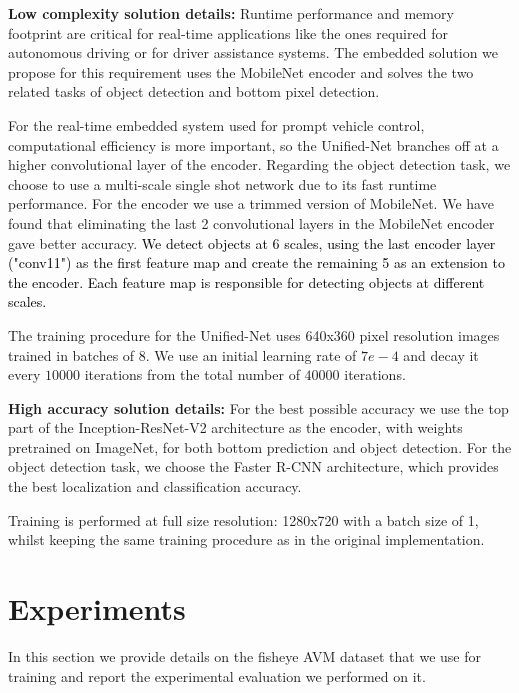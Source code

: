 \documentclass[10pt,twocolumn,letterpaper]{article}
\begin{document}
\textbf{Low complexity solution details: }
Runtime performance and memory footprint are critical for real-time applications like the ones required for autonomous driving or for driver assistance systems. The embedded solution we propose for this requirement uses the MobileNet encoder and solves the two related tasks of object detection and bottom pixel detection. 

For the real-time embedded system used for prompt vehicle control, computational efficiency is more important, so the Unified-Net branches off at a higher convolutional layer of the encoder. Regarding the object detection task, we choose to use a multi-scale single shot network due to its fast runtime performance. For the encoder we use a trimmed version of MobileNet. We have found that eliminating the last 2 convolutional layers in the MobileNet encoder gave better accuracy. \textcolor{black}{
We detect objects at 6 scales, using the last encoder layer ("conv11") as the first feature map and create the remaining 5 as an extension to the encoder. Each feature map is responsible for detecting objects at different scales.
}



The training procedure for the Unified-Net uses 640x360 pixel resolution images trained in batches of 8. We use an initial learning rate of $7e-4$ and decay it every $10000$ iterations from the total number of $40000$ iterations.

\textbf{High accuracy solution details: } For the best possible accuracy we use the top part of the Inception-ResNet-V2 architecture as the encoder, with weights pretrained on ImageNet, for both bottom prediction and object detection. For the object detection task, we choose the Faster R-CNN architecture, which provides the best localization and classification accuracy.

Training is performed at full size resolution: 1280x720 with a batch size of 1, whilst keeping the same training procedure as in the original implementation. %

\section{Experiments}

In this section we provide details on the fisheye AVM dataset that we use for training and report the experimental evaluation we performed on it.
\end{document}
